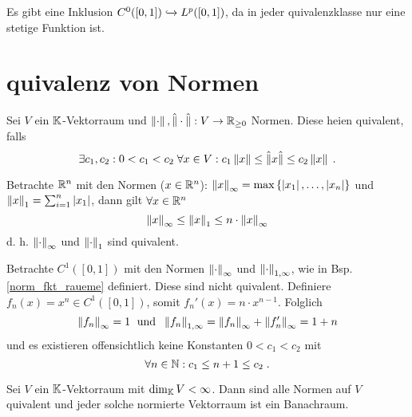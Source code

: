 	\begin{rem}
		Es gibt eine Inklusion \(C^0([0,1])\xhookrightarrow{} L^p([0,1])\), da in jeder \As quivalenzklasse nur eine stetige Funktion ist.
	\end{rem}
	
	\section{\As quivalenz von Normen}
	\begin{definition}
		Sei $V$ ein $\mathbb{K}$-Vektorraum und \(\left\lVert\cdot\right\rVert, \hat\lVert\cdot\hat\rVert: V \to \mathbb{R}_{\geq 0}\) Normen. Diese hei\s en \as quivalent, falls
		\[\exists c_1, c_2: 0 < c_1 < c_2 \; \forall x \in V : c_1 \left\lVert x\right\rVert \leq \hat\lVert x\hat\rVert \leq c_2 \left\lVert x\right\rVert\;.\]
	\end{definition}
	
	\begin{ex}
		Betrachte \(\mathbb{R}^n\) mit den Normen (\(x\in\mathbb{R}^n\)): \(\left\lVert x\right\rVert_\infty = \max\left\{\left\lvert x_1 \right\rvert,\ldots, \left\lvert x_n \right\rvert\right\}\) und \(\left\lVert x\right\rVert_{1} = \sum_{i=1}^n \left\lvert x_1 \right\rvert\), dann gilt \(\forall x\in \mathbb{R}^n\)
		\[\left\lVert x\right\rVert_\infty \leq \left\lVert x\right\rVert_{1} \leq n\cdot \left\lVert x\right\rVert_\infty\]
		d. h. \(\left\lVert\cdot\right\rVert_\infty\) und \(\left\lVert\cdot\right\rVert_{1}\) sind \as quivalent.
	\end{ex}
	
	\begin{ex}
		Betrachte \(C^1([0,1])\) mit den Normen \(\left\lVert\cdot\right\rVert_\infty \) und \(\left\lVert\cdot\right\rVert_{1,\infty}\), wie in Bsp. \ref{norm_fkt_raueme} definiert. Diese sind nicht \as quivalent. Definiere \(f_n(x) = x^n \in C^1([0,1])\), somit \(f_n'(x) = n \cdot x^{n-1}\). Folglich
		\[\left\lVert f_n\right\rVert_\infty = 1 \;\text { und }\; \left\lVert f_n\right\rVert_{1, \infty} = \left\lVert f_n\right\rVert_\infty + \left\lVert f_n'\right\rVert_\infty = 1 + n\] 
		und es existieren offensichtlich keine Konstanten \(0<c_1<c_2\) mit 
		\[\forall n \in \mathbb{N}: c_1 \leq n+1 \leq c_2\;.\]
	\end{ex}
	
	\begin{theorem}
		Sei $V$ ein $\mathbb{K}$-Vektorraum mit \(\dim_{\mathbb{K}} V < \infty\). Dann sind alle Normen auf $V$ \as quivalent und jeder solche normierte Vektorraum ist ein Banachraum.
	\end{theorem}